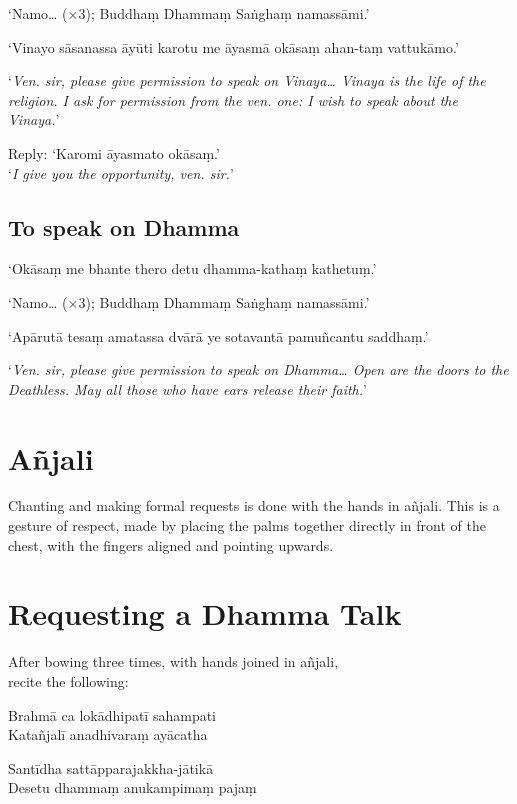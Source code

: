 ‘Namo… (×3); Buddhaṃ Dhammaṃ Saṅghaṃ namassāmi.’

‘Vinayo sāsanassa āyūti karotu me āyasmā okāsaṃ ahan-taṃ vattukāmo.’

‘\emph{Ven. sir, please give permission to speak on Vinaya… Vinaya is the life
  of the religion. I ask for permission from the ven. one: I wish to speak about
  the Vinaya.}’

Reply: ‘Karomi āyasmato okāsaṃ.’\\
‘\emph{I give you the opportunity, ven. sir.}’ 

\subsection{To speak on Dhamma}


‘Okāsaṃ me bhante thero detu dhamma-kathaṃ kathetuṃ.’

‘Namo… (×3); Buddhaṃ Dhammaṃ Saṅghaṃ namassāmi.’

‘Apārutā tesaṃ amatassa dvārā ye sotavantā pamuñcantu saddhaṃ.’

‘\emph{Ven. sir, please give permission to speak on Dhamma… Open are the doors
  to the Deathless. May all those who have ears release their faith.}’

\section{Añjali}

Chanting and making formal requests is done with the hands in añjali.
This is a gesture of respect, made by placing the palms together
directly in front of the chest, with the fingers aligned and pointing
upwards.

\section{Requesting a Dhamma Talk}

\begin{instruction}
  After bowing three times, with hands joined in añjali,\\
  recite the following:
\end{instruction}

Brahmā ca lokādhipatī sahampati\\
Katañjalī anadhivaraṃ ayācatha

Santīdha sattāpparajakkha-jātikā\\
Desetu dhammaṃ anukampimaṃ pajaṃ

